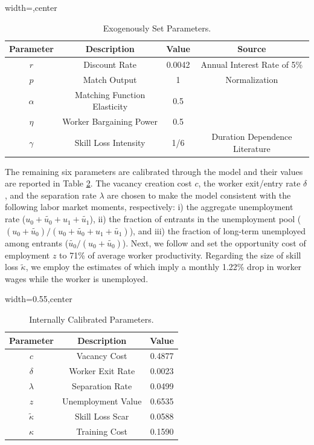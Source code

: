 \documentclass[12pt]{article} %
\theoremstyle{definition}
\begin{document}
\begin{table}[h!]
\centering 
\begin{adjustbox}{width=\columnwidth,center}
 \begin{tabular}{||c c c c||} 
 \hline
 \textbf{Parameter} & \textbf{Description} & \textbf{Value} & \textbf{Source} \\ 
 \hline\hline
  $r$ & Discount Rate & 0.0042 & Annual Interest Rate of 5\% \\ 
   $p$ & Match Output &  1 & Normalization \\
 $\alpha$ & Matching Function Elasticity & 0.5 & \cite{menzio2016directed} \\
   $\eta$ & Worker Bargaining Power  & 0.5 & \cite{shimer2005cyclical} \\
  $\gamma$ & Skill Loss Intensity & 1/6 &  Duration Dependence Literature \\ [1ex] 
 \hline
 \end{tabular}
\end{adjustbox}
\caption{Exogenously Set Parameters.} \label{table_set_parameters}
\end{table} 

The remaining six parameters are calibrated through the model and their values are reported in Table \ref{table_calibrated_parameters}.
The vacancy creation cost $c$, the worker exit/entry rate $\delta$, and the separation rate $\lambda$ are chosen to make the model consistent with the following labor market moments, respectively: i) the aggregate unemployment rate ($u_{0} + \tilde{u_{0}} + u_{1} + \tilde{u_{1}}$), ii) the fraction of entrants in the unemployment pool ($(u_{0} + \tilde{u_{0}})/(u_{0} + \tilde{u_{0}} + u_{1} + \tilde{u_{1}})$), and iii) the fraction of long-term unemployed among entrants ($\tilde{u_{0}}/(u_{0} + \tilde{u_{0}})$).
Next, we follow \cite{hall2008limited} and set the opportunity cost of employment $z$ to 71\% of average worker productivity.
Regarding the size of skill loss $\tilde{\kappa}$, we employ the estimates of \cite{ortego2016unemployment, ortego2017loss} which imply a monthly 1.22\% drop in worker wages while the worker is unemployed.

\begin{table}[h!]
\centering
\begin{adjustbox}{width=0.55\columnwidth,center}
 \begin{tabular}{||c c c||} 
 \hline
 \textbf{Parameter} & \textbf{Description} & \textbf{Value} \\  
 \hline\hline
  $c$ & Vacancy Cost & 0.4877  \\
  $\delta$  & Worker Exit Rate    & 0.0023   \\ 
  $\lambda$  & Separation Rate    & 0.0499  \\
  $z$ & Unemployment Value  & 0.6535  \\
  $ \tilde{\kappa}$  & Skill Loss Scar & 0.0588 \\ 
   $\kappa$  & Training Cost & 0.1590 \\ [1ex] 
 \hline
 \end{tabular}
\end{adjustbox}
  \caption{Internally Calibrated Parameters.} \label{table_calibrated_parameters}
\end{table}
\end{document}
